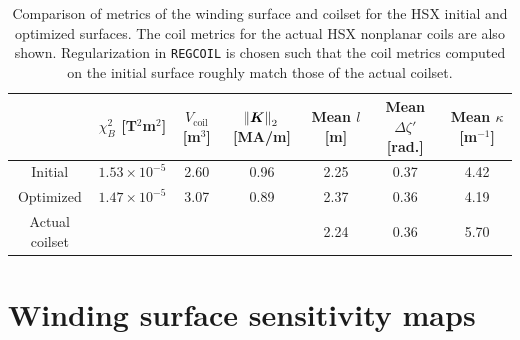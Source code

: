 \documentclass[aps,unsortedaddress]{revtex4-1}
\begin{document}
\begin{table}
\renewcommand{\arraystretch}{1.4}
\begin{tabular} {| c | c | c | c | c | c | c |}
\hline
& $\chi^2_B$ [T$^2$m$^2$] & $V_{\text{coil}}$[m$^3$] & $\norm{\bm{K}}_2$ [MA/m] & Mean $l$ [m] & Mean $\Delta \zeta'$ [rad.] & Mean $\kappa$ [m$^{-1}$] \\ \hline 
Initial & $1.53\times10^{-5}$ & 2.60 & 0.96 & 2.25 & 0.37 & 4.42 \\ \hline
Optimized & $1.47\times10^{-5}$ & 3.07 & 0.89 & 2.37 & 0.36 & 4.19 \\ \hline
Actual coilset & & & & 2.24 & 0.36 & 5.70 \\ \hline
\end{tabular}
\caption{Comparison of metrics of the winding surface and coilset for the HSX initial and optimized surfaces. The coil metrics for the actual HSX nonplanar coils are also shown. Regularization in \texttt{REGCOIL} is chosen such that the coil metrics computed on the initial surface roughly match those of the actual coilset.}
\label{table_hsx}
\end{table}

\FloatBarrier
\section{Winding surface sensitivity maps}
\label{sect_sensitivity}
\FloatBarrier
\end{document}
